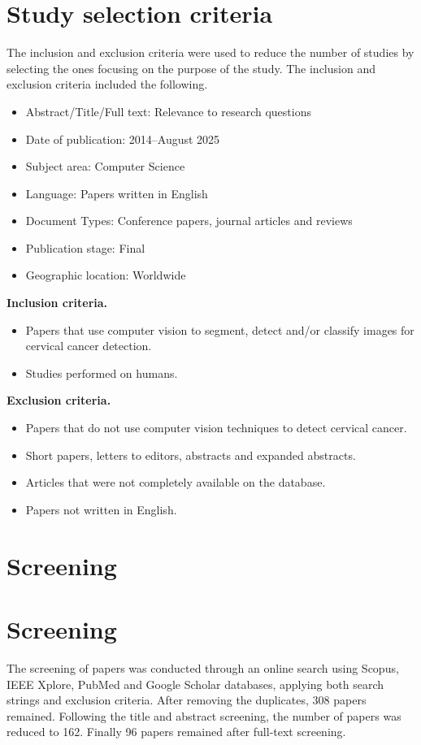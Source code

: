\documentclass{svjour3}
\begin{document}
\section{Study selection criteria}
The inclusion and exclusion criteria were used to reduce the number of studies by selecting the ones focusing on the purpose of the study. The inclusion and exclusion criteria included the following.
\begin{itemize}
\item Abstract/Title/Full text: Relevance to research questions
\item Date of publication: 2014–August 2025
\item Subject area: Computer Science
\item Language: Papers written in English
\item Document Types: Conference papers, journal articles and reviews
\item Publication stage: Final
\item Geographic location: Worldwide
\end{itemize}
\textbf{Inclusion criteria.}
\begin{itemize}
\item Papers that use computer vision to segment, detect and/or classify images for cervical cancer detection.
\item Studies performed on humans.
\end{itemize}
\textbf{Exclusion criteria.}
\begin{itemize}
\item Papers that do not use computer vision techniques to detect cervical cancer.
\item Short papers, letters to editors, abstracts and expanded abstracts.
\item Articles that were not completely available on the database.
\item Papers not written in English.
\end{itemize}
\section{Screening}

\section{Screening}
The screening of papers was conducted through an online search using Scopus, IEEE Xplore, PubMed and Google Scholar databases, applying both search strings and exclusion criteria. After removing the duplicates, 308 papers remained. Following the title and abstract screening, the number of papers was reduced to 162. Finally 96 papers remained after full‑text screening.
\end{document}

